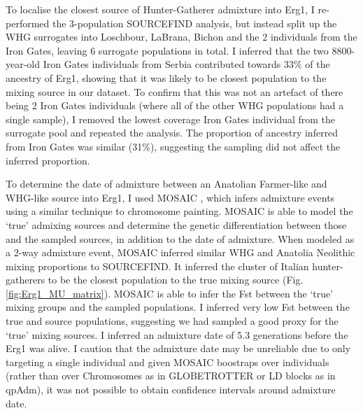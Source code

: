 To localise the closest source of Hunter-Gatherer admixture into Erg1, I re-performed the 3-population SOURCEFIND analysis, but instead split up the WHG surrogates into Loschbour, LaBrana, Bichon and the 2 individuals from the Iron Gates, leaving 6 surrogate populations in total. I inferred that the two 8800-year-old Iron Gates individuals from Serbia contributed towards 33\% of the ancestry of Erg1, showing that it was likely to be closest population to the mixing source in our dataset. To confirm that this was not an artefact of there being 2 Iron Gates individuals (where all of the other WHG populations had a single sample), I removed the lowest coverage Iron Gates individual from the surrogate pool and repeated the analysis. The proportion of ancestry inferred from Iron Gates was similar (31\%), suggesting the sampling did not affect the inferred proportion.

To determine the date of admixture between an Anatolian Farmer-like and WHG-like source into Erg1, I used MOSAIC \cite{MOSAIC_2019}, which infers admixture events using a similar technique to chromosome painting. MOSAIC is able to model the `true' admixing sources and determine the genetic differentiation between those and the sampled sources, in addition to the date of admixture. When modeled as a 2-way admixture event, MOSAIC inferred similar WHG and Anatolia Neolithic mixing proportions to SOURCEFIND. It inferred the cluster of Italian hunter-gatherers to be the closest population to the true mixing source (Fig. \ref{fig:Erg1_MU_matrix}). MOSAIC is able to infer the Fst between the `true' mixing groups and the sampled populations. I inferred very low Fst between the true and source populations, suggesting we had sampled a good proxy for the `true’ mixing sources. I inferred an admixture date of 5.3 generations before the Erg1 was alive. I caution that the admixture date may be unreliable due to only targeting a single individual and given MOSAIC boostraps over individuals (rather than over Chromosomes as in GLOBETROTTER or LD blocks as in qpAdm), it was not possible to obtain confidence intervals around admixture date. 

